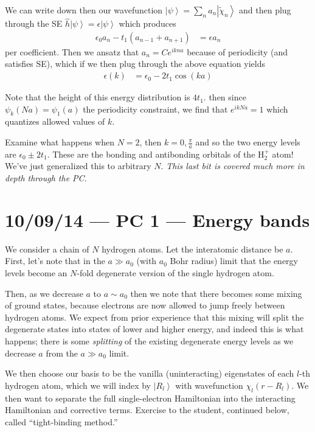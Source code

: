 \documentclass[10pt]{report}
\newcommand{\ket}[1]{\left|#1\right>}
\begin{document}
We can write down then our wavefunction $\ket{\psi} = \sum\limits_{n}^{}a_n \ket{\tilde{\chi}_n}$ and then plug through the SE $\hat{h}\ket{\psi} = \epsilon\ket{\psi}$ which produces
\begin{align}
    \epsilon_0 a_n - t_1\left( a_{n-1} + a_{n+1} \right) &= \epsilon a_n
\end{align}
per coefficient. Then we ansatz that $a_n = Ce^{ikna}$ because of periodicity (and satisfies SE), which if we then plug through the above equation yields
\begin{align}
    \epsilon(k) &= \epsilon_0 - 2t_1 \cos(ka)
\end{align}

Note that the height of this energy distribution is $4t_1$. then since $\psi_k(Na) = \psi_1(a)$ the periodicity constraint, we find that $e^{ikNa} = 1$ which quantizes allowed values of $k$.

Examine what happens when $N=2$, then $k = 0, \frac{\pi}{a}$ and so the two energy levels are $\epsilon_0 \pm 2t_1$. These are the bonding and antibonding orbitals of the H$_2^+$ atom! We've just generalized this to arbitrary $N$. \emph{This last bit is covered much more in depth through the PC.}

\chapter{10/09/14 --- PC 1 --- Energy bands}

We consider a chain of $N$ hydrogen atoms. Let the interatomic distance be $a$. First, let's note that in the $a \gg a_0$ (with $a_0$ Bohr radius) limit that the energy levels become an $N$-fold degenerate version of the single hydrogen atom.

Then, as we decrease $a$ to $a \sim a_0$ then we note that there becomes some mixing of ground states, because electrons are now allowed to jump freely between hydrogen atoms. We expect from prior experience that this mixing will split the degenerate states into states of lower and higher energy, and indeed this is what happens; there is some \emph{splitting} of the existing degenerate energy levels as we decrease $a$ from the $a \gg a_0$ limit.

We then choose our basis to be the vanilla (uninteracting) eigenstates of each $l$-th hydrogen atom, which we will index by $\ket{R_l}$ with wavefunction $\chi_l(r - R_l)$. We then want to separate the full single-electron Hamiltonian into the interacting Hamiltonian and corrective terms. Exercise to the student, continued below, called ``tight-binding method.''
\end{document}
